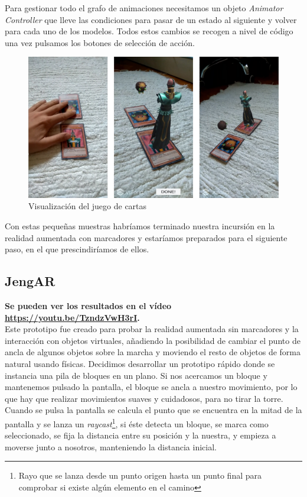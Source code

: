 Para gestionar todo el grafo de animaciones necesitamos un objeto \textit{Animator Controller} que lleve las condiciones para pasar de un estado al siguiente y volver para cada uno de los modelos. Todos estos cambios se recogen a nivel de código una vez pulsamos los botones de selección de acción.\\

\begin{figure}[H]
    \centering
    \includegraphics[width=\linewidth]{Images/YuGiOh.jpg}
    \caption{Visualización del juego de cartas}
    \label{YuGi}
\end{figure}

Con estas pequeñas muestras habríamos terminado nuestra incursión en la realidad aumentada con marcadores y estaríamos preparados para el siguiente paso, en el que prescindiríamos de ellos.

\subsection{JengAR}
\textbf{Se pueden ver los resultados en el vídeo \url{https://youtu.be/TzndzVwH3rI}.}\\
Este prototipo fue creado para probar la realidad aumentada sin marcadores y la interacción con objetos virtuales, añadiendo la posibilidad de cambiar el punto de ancla de algunos objetos sobre la marcha y moviendo el resto de objetos de forma natural usando físicas. 
Decidimos desarrollar un prototipo rápido donde se instancia una pila de bloques en un plano. Si nos acercamos un bloque y mantenemos pulsado la pantalla, el bloque se ancla a nuestro movimiento, por lo que hay que realizar movimientos suaves y cuidadosos, para no tirar la torre.\\

Cuando se pulsa la pantalla se calcula el punto que se encuentra en la mitad de la pantalla y se lanza un \textit{raycast}\footnote{Rayo que se lanza desde un punto origen hasta un punto final para comprobar si existe algún elemento en el camino}, si éste detecta un bloque, se marca como seleccionado, se fija la distancia entre su posición y la nuestra, y empieza a moverse junto a nosotros, manteniendo la distancia inicial.\\

